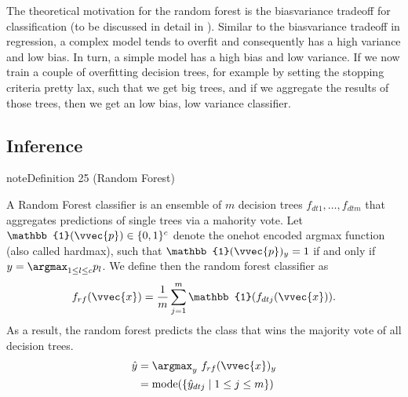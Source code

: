 \documentclass[letterpaper,10pt,english]{jupyterBook}
\begin{document}
\sphinxAtStartPar
The theoretical motivation for the random forest is the bias\sphinxhyphen{}variance tradeoff for classification (to be discussed in detail in {\hyperref[\detokenize{classification_evaluation:class-evaluation}]{}}). Similar to the bias\sphinxhyphen{}variance tradeoff in regression, a complex model tends to overfit and consequently has a high variance and low bias. In turn, a simple model has a high bias and low variance. If we now train a couple of overfitting decision trees, for example by setting the stopping criteria pretty lax, such that we get big trees, and if we aggregate the results of those trees, then we get an low bias, low variance classifier.


\subsection{Inference}
\label{\detokenize{classification_random_forests:inference}}\label{classification_random_forests:definition-0}
\begin{sphinxadmonition}{note}{Definition 25 (Random Forest)}



\sphinxAtStartPar
A Random Forest classifier is an ensemble of \(m\) decision trees \(f_{dt1},\ldots,f_{dtm}\) that aggregates predictions of single trees via a mahority vote. Let \(\mathbb{1}(\vvec{p})\in\{0,1\}^c\) denote the one\sphinxhyphen{}hot encoded argmax function (also called hardmax), such that \(\mathbb{1}(\vvec{p})_y=1\) if and only if \(y = \argmax_{1\leq l\leq c} p_l\). We define then the random forest classifier as
\begin{equation*}
\begin{split} f_{rf}(\vvec{x})= \frac{1}{m}\sum_{j=1}^m \mathbb{1}(f_{dtj}(\vvec{x})).\end{split}
\end{equation*}
As a result, the random forest predicts the class that wins the majority vote of all decision trees.
\begin{align*}
\hat{y} & = \argmax_y\ f_{rf}(\vvec{x})_y\\
&= \mathrm{mode}(\{\hat{y}_{dtj}\mid 1\leq j\leq m\})
\end{align*}\end{sphinxadmonition}
\end{document}
